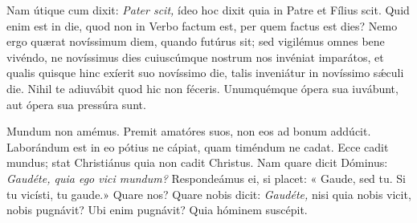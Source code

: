{\noindent Nam útique cum dixit: \emph{Pater scit,} ídeo hoc dixit quia in Patre et Fílius scit. Quid enim est in die, quod non in Verbo factum est, per quem factus est dies? Nemo ergo quærat novíssimum diem, quando futúrus sit; sed vigilémus omnes bene vivéndo, ne novíssimus dies cuiuscúmque nostrum nos invéniat imparátos, et qualis quisque hinc exíerit suo novíssimo die, talis inveniátur in novíssimo sǽculi die. Nihil te adiuvábit quod hic non féceris. Unumquémque ópera sua iuvábunt, aut ópera sua pressúra sunt.

\noindent Mundum non amémus. Premit amatóres suos, non eos ad bonum addúcit. Laborándum est in eo pótius ne cápiat, quam timéndum ne cadat. Ecce cadit mundus; stat Christiánus quia non cadit Christus. Nam quare dicit Dóminus: \emph{Gaudéte, quia ego vici mundum?} Respondeámus ei, si placet: « Gaude, sed tu. Si tu vicísti, tu gaude.» Quare nos? Quare nobis dicit: \emph{Gaudéte,} nisi quia nobis vicit, nobis pugnávit? Ubi enim pugnávit? Quia hóminem suscépit.

\vfill
\pagebreak

 

\vspace{-5mm}


\vfill
\pagebreak
}
\newcommand{\responsoriumbreve}{\pars{Responsorium breve.}

\cuminitiali{VI}{temporalia/resp-christefilidei.gtex}}
\newcommand{\benedictus}{\pars{Canticum Zachariæ.} \scriptura{Mt. 24, 32-33; Cf. Mc. 13, 28-29}

\vspace{-6mm}

\antiphona{VIII G}{temporalia/ant-abarboreautemfici.gtex}

\vspace{-1mm}

\scriptura{Lc. 1, 68-79}

\vspace{-3mm}

\cantusSineNeumas
\initiumpsalmi{temporalia/benedictus-initium-viisoll-a-auto.gtex}

\vspace{-1.5mm}

 \Abardot{}}


